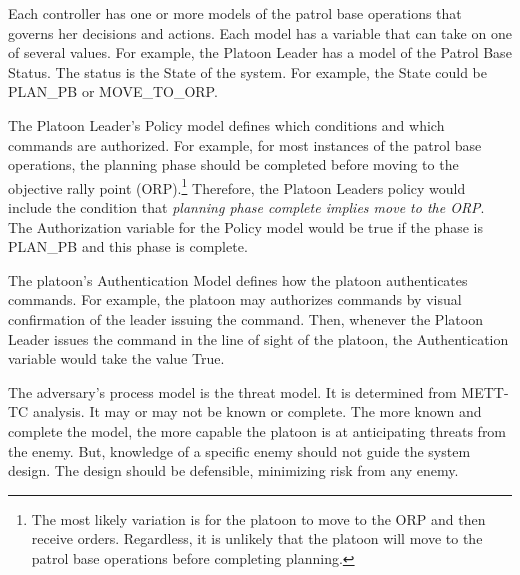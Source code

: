 \documentclass[../../main/main.tex]{subfiles}
\begin{document}
 Each controller has one or more models of the patrol base operations that governs her decisions and actions.  Each model has a variable that can take on one of several values.  For example, the Platoon Leader has a model of the Patrol Base Status.  The status is the State of the system.  For example, the State could be PLAN_PB or MOVE_TO_ORP.   
 
 The Platoon Leader's Policy model defines which conditions and which commands are authorized.  For example, for most instances of the patrol base operations, the planning phase should be completed before moving to the objective rally point (ORP).\footnote{The most likely variation is for the platoon to move to the ORP and then receive orders.   Regardless, it is unlikely that the platoon will move to the patrol base operations before completing planning.}  Therefore, the Platoon Leaders policy would include the condition that \textit{planning phase complete implies move to the ORP}.  The Authorization variable for the Policy model would be true if the phase is PLAN_PB and this phase is complete.  
 
 The platoon's Authentication Model defines how the platoon authenticates commands.    For example, the platoon may authorizes commands by visual confirmation of the leader issuing the command.  Then, whenever the Platoon Leader issues the command in the line of sight of the platoon, the Authentication variable would take the value True.   
 
 The adversary's process model is the threat model.  It is determined from METT-TC analysis.  It may or may not be known or complete.  The more known and complete the model, the more capable the platoon is at anticipating threats from the enemy.  But, knowledge of a specific enemy should not guide the system design.  The design should be defensible, minimizing risk from any enemy.
\clearpage
\end{document}
